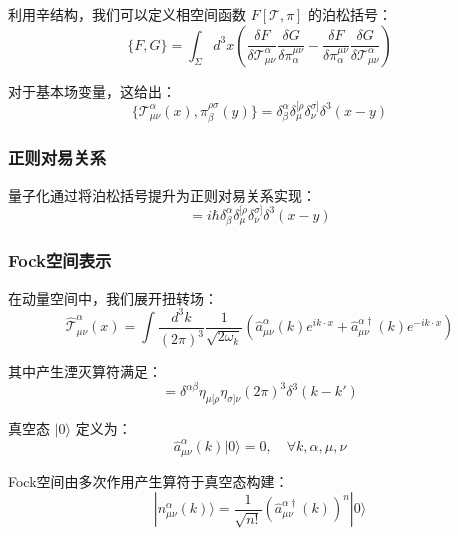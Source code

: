 利用辛结构，我们可以定义相空间函数 $F[\mathcal{T}, \pi]$ 的泊松括号：
\begin{equation}
    \{F, G\} = \int_\Sigma d^3x \left( \frac{\delta F}{\delta\mathcal{T}^\alpha_{\mu\nu}} \frac{\delta G}{\delta\pi_\alpha^{\mu\nu}} - \frac{\delta F}{\delta\pi_\alpha^{\mu\nu}} \frac{\delta G}{\delta\mathcal{T}^\alpha_{\mu\nu}} \right)
\end{equation}

对于基本场变量，这给出：
\begin{equation}
    \{\mathcal{T}^\alpha_{\mu\nu}(x), \pi_\beta^{\rho\sigma}(y)\} = \delta^\alpha_\beta \delta^{[\rho}_\mu \delta^{\sigma]}_\nu \delta^3(x - y)
\end{equation}

\subsubsection{正则对易关系}

量子化通过将泊松括号提升为正则对易关系实现：
\begin{equation}
    [\hat{\mathcal{T}}^\alpha_{\mu\nu}(x), \hat{\pi}_\beta^{\rho\sigma}(y)] = i\hbar \delta^\alpha_\beta \delta^{[\rho}_\mu \delta^{\sigma]}_\nu \delta^3(x - y)
\end{equation}

\subsubsection{Fock空间表示}

在动量空间中，我们展开扭转场：
\begin{equation}
    \hat{\mathcal{T}}^\alpha_{\mu\nu}(x) = \int \frac{d^3k}{(2\pi)^3} \frac{1}{\sqrt{2\omega_k}} \left( \hat{a}^\alpha_{\mu\nu}(k) e^{ik\cdot x} + \hat{a}^{\alpha\dagger}_{\mu\nu}(k) e^{-ik\cdot x} \right)
\end{equation}

其中产生湮灭算符满足：
\begin{equation}
    [\hat{a}^\alpha_{\mu\nu}(k), \hat{a}^{\beta\dagger}_{\rho\sigma}(k')] = \delta^{\alpha\beta} \eta_{\mu[\rho} \eta_{\sigma]\nu} (2\pi)^3 \delta^3(k - k')
\end{equation}

真空态 $|0\rangle$ 定义为：
\begin{equation}
    \hat{a}^\alpha_{\mu\nu}(k) |0\rangle = 0, \quad \forall k, \alpha, \mu, \nu
\end{equation}

Fock空间由多次作用产生算符于真空态构建：
\begin{equation}
    |n^\alpha_{\mu\nu}(k)\rangle = \frac{1}{\sqrt{n!}} \left( \hat{a}^{\alpha\dagger}_{\mu\nu}(k) \right)^n |0\rangle
\end{equation}

